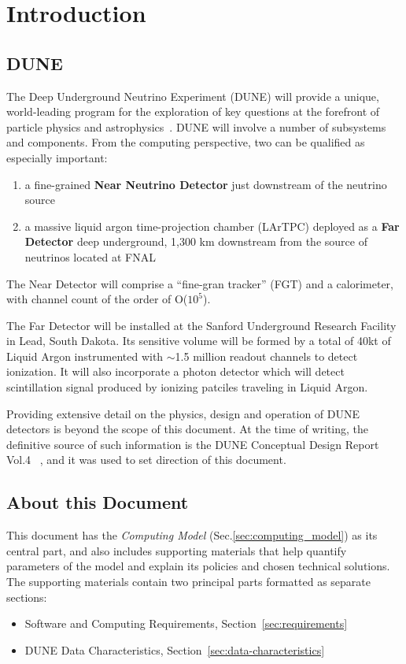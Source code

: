 \section{Introduction}
\subsection{DUNE}

The Deep Underground Neutrino Experiment (DUNE) will provide a unique, world-leading program
for the exploration of key questions at the forefront of particle physics and astrophysics~\cite{sciopps}.
DUNE will involve a number of subsystems and components. From the computing perspective, two can be
qualified as especially important:

\begin{enumerate}

\item a fine-grained \textbf{Near Neutrino Detector} just downstream of the neutrino source
\item a massive liquid argon time-projection chamber (LArTPC) deployed as a \textbf{Far
Detector} deep underground, 1,300 km downstream from the source of neutrinos located at FNAL

\end{enumerate}

The Near Detector will comprise a ``fine-gran tracker'' (FGT) and a calorimeter, with channel count of the order of O($10^{5}$).

The Far Detector will be installed at the Sanford Underground Research Facility in Lead, South Dakota.
Its sensitive volume will be formed by a total of 40kt of Liquid Argon instrumented with $\sim$1.5 million readout
channels to detect ionization. It will also incorporate a photon detector which will detect scintillation
signal produced by ionizing patciles traveling in Liquid Argon.

Providing extensive detail on the physics, design and operation of DUNE detectors  is beyond the scope of this document.
At the time of writing, the definitive source of such information is the DUNE Conceptual Design Report Vol.4 ~\cite{cdr_vol4_docdb}, and 
it was used to set direction of this document.


\subsection{About this Document}
\label{sec:modelrole}

This document has the \textit{Computing Model} (Sec.\ref{sec:computing_model}) as its central part, and also
includes supporting materials that help quantify parameters of the model and explain its policies and
chosen technical solutions. The supporting materials contain two principal parts formatted as separate sections:
\begin{itemize}
\item Software and Computing Requirements, Section~\ref{sec:requirements}
\item DUNE Data Characteristics, Section~\ref{sec:data-characteristics}
\end{itemize}

